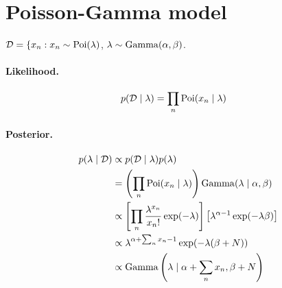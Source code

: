 \section{Poisson-Gamma model}
$\mathcal D = \{x_n : x_n \sim \operatorname{Poi}(\lambda)$, $\lambda \sim \operatorname{Gamma}(\alpha, \beta)$.

\paragraph{Likelihood.}
    \begin{align*}
        p(\mathcal D \mid \lambda) &= \prod_n \operatorname{Poi}(x_n \mid \lambda)
    \end{align*}

\paragraph{Posterior.}
    \begin{align*}
        p(\lambda \mid \mathcal D)  &\propto p(\mathcal D \mid \lambda) p(\lambda) \\
                                    &= \left(\prod_n \operatorname{Poi}(x_n \mid \lambda) \right) \operatorname{Gamma}(\lambda \mid \alpha, \beta) \\
                                    &\propto \left[\prod_n \frac{\lambda^{x_n}}{x_n!} \exp(-\lambda)\right] \left[\lambda^{\alpha - 1} \exp(-\lambda\beta)\right] \\
                                    &\propto \lambda^{\alpha + \sum_n x_n - 1} \exp(-\lambda(\beta + N)) \\
                                    &\propto \operatorname{Gamma}\left(\lambda \mid \alpha + \sum_n x_n, \beta + N\right)
    \end{align*}


